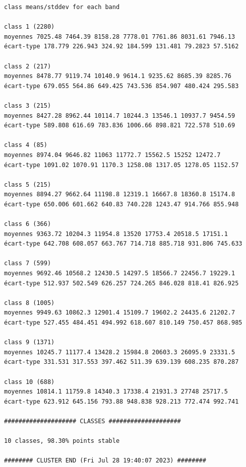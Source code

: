 \documentclass[earth,article,submit,pdftex,moreauthors]{Definitions/mdpi}
\begin{document}
\begin{scriptsize}
\begin{verbatim}
class means/stddev for each band

class 1 (2280)
moyennes 7025.48 7464.39 8158.28 7778.01 7761.86 8031.61 7946.13
écart-type 178.779 226.943 324.92 184.599 131.481 79.2823 57.5162

class 2 (217)
moyennes 8478.77 9119.74 10140.9 9614.1 9235.62 8685.39 8285.76
écart-type 679.055 564.86 649.425 743.536 854.907 480.424 295.583

class 3 (215)
moyennes 8427.28 8962.44 10114.7 10244.3 13546.1 10937.7 9454.59
écart-type 589.808 616.69 783.836 1006.66 898.821 722.578 510.69

class 4 (85)
moyennes 8974.04 9646.82 11063 11772.7 15562.5 15252 12472.7
écart-type 1091.02 1070.91 1170.3 1258.08 1317.05 1278.05 1152.57

class 5 (215)
moyennes 8894.27 9662.64 11198.8 12319.1 16667.8 18360.8 15174.8
écart-type 650.006 601.662 640.83 740.228 1243.47 914.766 855.948

class 6 (366)
moyennes 9363.72 10204.3 11954.8 13520 17753.4 20518.5 17151.1
écart-type 642.708 608.057 663.767 714.718 885.718 931.806 745.633

class 7 (599)
moyennes 9692.46 10568.2 12430.5 14297.5 18566.7 22456.7 19229.1
écart-type 512.937 502.549 626.257 724.265 846.028 818.41 826.925

class 8 (1005)
moyennes 9949.63 10862.3 12901.4 15109.7 19602.2 24435.6 21202.7
écart-type 527.455 484.451 494.992 618.607 810.149 750.457 868.985

class 9 (1371)
moyennes 10245.7 11177.4 13428.2 15984.8 20603.3 26095.9 23331.5
écart-type 331.531 317.553 397.462 511.39 639.139 608.235 870.287

class 10 (688)
moyennes 10814.1 11759.8 14340.3 17338.4 21931.3 27748 25717.5
écart-type 623.912 645.156 793.88 948.838 928.213 772.474 992.741

#################### CLASSES ####################

10 classes, 98.30% points stable

######## CLUSTER END (Fri Jul 28 19:40:07 2023) ########

\end{verbatim}
\end{scriptsize}
\end{document}
